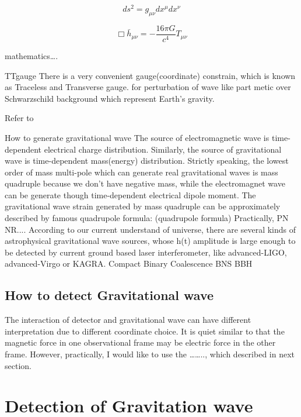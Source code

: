 \begin{equation}
    ds^2 = g_{\mu\nu} dx^{\mu} dx^{\nu}
\end{equation}




\begin{equation}
    \Box \bar{h}_{\mu\nu} = - \frac{16\pi G}{c^4}T_{\mu\nu}
\end{equation}


mathematics….

TTgauge
There is a very convenient gauge(coordinate) constrain, which is known as Traceless and Transverse gauge. 
for perturbation of wave like part metic over Schwarzschild background which represent Earth’s gravity.


Refer to \cite{maggiore:gw1}



How to generate gravitational wave
The source of electromagnetic wave is time-dependent electrical charge distribution.  Similarly, the source of gravitational wave is time-dependent mass(energy) distribution. Strictly speaking, the lowest order of mass multi-pole which can generate real gravitational waves is mass quadruple because we don’t have negative mass, while the electromagnet wave can be generate though time-dependent electrical dipole moment. The gravitational wave strain generated by mass quadruple can be approximately described by famous quadrupole formula:
(quadrupole formula)
Practically, PN NR....
According to our current understand of universe, there are several kinds of astrophysical gravitational wave sources, whose h(t) amplitude is large enough to be detected by current ground based laser interferometer, like advanced-LIGO, advanced-Virgo or KAGRA. 
Compact Binary Coalescence 
BNS BBH
\subsection{How to detect Gravitational wave}
The interaction of detector and gravitational wave can have different interpretation due to different coordinate choice\cite{ifo:gauge}. It is quiet similar to that the magnetic force in one observational frame may be electric force in the other frame. However, practically, I would like to use the …….., which described in next section.


\section{Detection of Gravitation wave}

